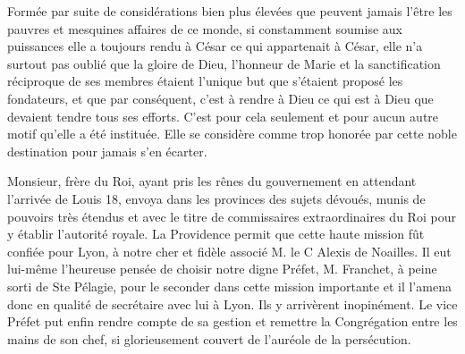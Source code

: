 Formée par suite de considérations bien plus élevées que peuvent jamais l'être les pauvres et mesquines affaires de ce monde, si constamment soumise aux puissances elle a toujours rendu à César ce qui appartenait à César, elle n'a surtout pas oublié que la gloire de Dieu, l'honneur de Marie et la sanctification réciproque de ses membres étaient l'unique but que s'étaient proposé les fondateurs, et que par conséquent, c'est à rendre à Dieu ce qui est à Dieu que devaient tendre tous ses efforts. C'est pour cela seulement et pour aucun autre motif qu'elle a été instituée. Elle se considère comme trop honorée par cette noble destination pour jamais s'en écarter.

Monsieur, frère du Roi, ayant pris les rênes du gouvernement en attendant l'arrivée de Louis 18, envoya dans les provinces des sujets dévoués, munis de pouvoirs très étendus et avec le titre de commissaires extraordinaires du Roi pour y établir l'autorité royale. La Providence permit que cette
haute mission fût confiée pour Lyon, à notre cher et fidèle associé M. le C Alexis de Noailles. Il eut lui-même l'heureuse pensée de choisir notre digne Préfet, M. Franchet, à peine sorti de Ste Pélagie, pour le seconder dans cette mission importante et il l'amena donc en qualité de secrétaire avec lui à Lyon. Ils y arrivèrent inopinément. Le vice Préfet put enfin rendre compte de sa gestion et remettre la Congrégation entre les mains de son chef, si glorieusement couvert de l'auréole de la persécution.

